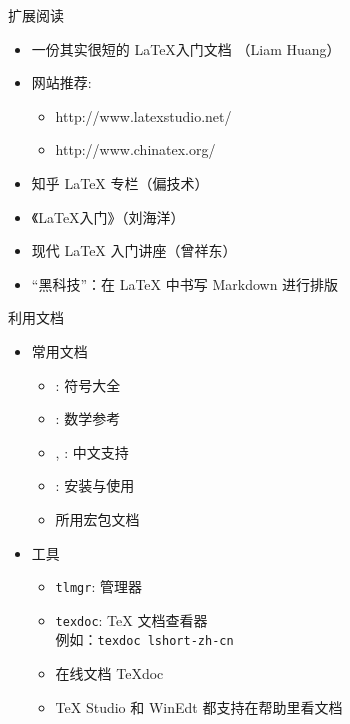 \begin{frame}{扩展阅读}
  \begin{itemize}
    \item 一份其实很短的 \LaTeX 入门文档 （Liam Huang）
    \item 网站推荐:
          \begin{itemize}
            \item http://www.latexstudio.net/
            \item http://www.chinatex.org/
          \end{itemize}
    \item 知乎 \LaTeX{} 专栏（偏技术）
    \item 《\LaTeX{}入门》（刘海洋）
    \item 现代 LaTeX
          入门讲座（曾祥东）
    \item “黑科技”：在 \LaTeX{} 中书写 Markdown 进行排版
  \end{itemize}
\end{frame}

\begin{frame}[fragile]{利用文档}
  \begin{itemize}
    \item 常用文档
          \begin{itemize}
            \item {}: 符号大全
            \item {}: 数学参考
            \item {}, : 中文支持
            \item {}: \TL 安装与使用
            \item 所用宏包文档
          \end{itemize}
    \item 工具
          \begin{itemize}
            \item \verb|tlmgr|: \TL 管理器
            \item \verb|texdoc|: \TeX{} 文档查看器\\
                  例如：\verb|texdoc lshort-zh-cn|
            \item 在线文档 \TeX{}doc 
            \item TeX Studio 和 WinEdt 都支持在帮助里看文档
          \end{itemize}
  \end{itemize}
\end{frame}

